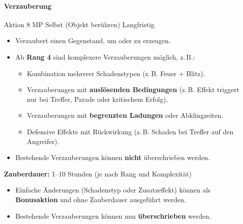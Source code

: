 \paragraph*{Verzauberung}
\spellcard
{}
{Aktion}
{8 MP}
{Selbst (Objekt berühren)}
{Langfristig}
{
	\begin{itemize}
		\item Verzaubert einen Gegenstand, um  oder  zu erzeugen.
		\item Ab \textbf{Rang 4} sind komplexere Verzauberungen möglich, z.\,B.:
		\begin{itemize}
			\item Kombination mehrerer Schadenstypen (z.\,B. Feuer + Blitz).
			\item Verzauberungen mit \textbf{auslösenden Bedingungen}
			(z.\,B. Effekt triggert nur bei Treffer, Parade oder kritischem Erfolg).
			\item Verzauberungen mit \textbf{begrenzten Ladungen} oder Abklingzeiten.
			\item Defensive Effekte mit Rückwirkung (z.\,B. Schaden bei Treffer auf den Angreifer).
		\end{itemize}
		\item Bestehende Verzauberungen können \textbf{nicht} überschrieben werden.
	\end{itemize}
	
	\medskip
	\textbf{Zauberdauer:} 1--10 Stunden (je nach Rang und Komplexität)
}
{
	\begin{itemize}
		\item Einfache Änderungen (Schadenstyp oder Zusatzeffekt) können als \textbf{Bonusaktion} und ohne Zauberdauer ausgeführt werden.
		\item Bestehende Verzauberungen können nun \textbf{überschrieben} werden.
	\end{itemize}
}

